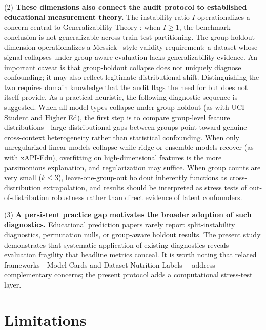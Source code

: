 \documentclass[10pt,letterpaper]{article}
\begin{document}
(2) \textbf{These dimensions also connect the audit protocol to established educational measurement theory. } The instability ratio $I$ operationalizes a concern central to Generalizability Theory \citep{Brennan2001}: when $I \geq 1$, the benchmark conclusion is not generalizable across train-test partitioning. The group-holdout dimension operationalizes a Messick~\citep{Messick1995}-style validity requirement: a dataset whose signal collapses under group-aware evaluation lacks generalizability evidence. An important caveat is that group-holdout collapse does not uniquely diagnose confounding; it may also reflect legitimate distributional shift. Distinguishing the two requires domain knowledge that the audit flags the need for but does not itself provide. As a practical heuristic, the following diagnostic sequence is suggested. When all model types collapse under group holdout (as with UCI Student and Higher Ed), the first step is to compare group-level feature distributions---large distributional gaps between groups point toward genuine cross-context heterogeneity rather than statistical confounding. When only unregularized linear models collapse while ridge or ensemble models recover (as with xAPI-Edu), overfitting on high-dimensional features is the more parsimonious explanation, and regularization may suffice. When group counts are very small ($k \leq 3$), leave-one-group-out holdout inherently functions as cross-distribution extrapolation, and results should be interpreted as stress tests of out-of-distribution robustness rather than direct evidence of latent confounders.

(3) \textbf{A persistent practice gap motivates the broader adoption of such diagnostics.} Educational prediction papers rarely report split-instability diagnostics, permutation nulls, or group-aware holdout results. The present study demonstrates that systematic application of existing diagnostics reveals evaluation fragility that headline metrics conceal. It is worth noting that related frameworks---Model Cards \citep{Mitchell2019} and Dataset Nutrition Labels \citep{Holland2020}---address complementary concerns; the present protocol adds a computational stress-test layer.

\section{Limitations}
\end{document}
